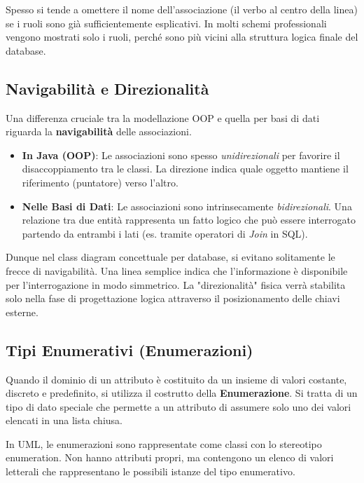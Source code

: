 \begin{observation}
    Spesso si tende a omettere il nome dell'associazione (il verbo al centro della linea) se i ruoli sono già sufficientemente esplicativi. In molti schemi professionali vengono mostrati solo i ruoli, perché sono più vicini alla struttura logica finale del database.
\end{observation}

\subsection{Navigabilità e Direzionalità}

Una differenza cruciale tra la modellazione OOP e quella per basi di dati riguarda la \textbf{navigabilità} delle associazioni.

\begin{itemize}
    \item \textbf{In Java (OOP)}: Le associazioni sono spesso \textit{unidirezionali} per favorire il disaccoppiamento tra le classi. La direzione indica quale oggetto mantiene il riferimento (puntatore) verso l'altro.
    \item \textbf{Nelle Basi di Dati}: Le associazioni sono intrinsecamente \textit{bidirezionali}. Una relazione tra due entità rappresenta un fatto logico che può essere interrogato partendo da entrambi i lati (es. tramite operatori di \textit{Join} in SQL).
\end{itemize}

\medskip

Dunque nel class diagram concettuale per database, si evitano solitamente le frecce di navigabilità. Una linea semplice indica che l'informazione è disponibile per l'interrogazione in modo simmetrico. La "direzionalità" fisica verrà stabilita solo nella fase di progettazione logica attraverso il posizionamento delle chiavi esterne.


\subsection{Tipi Enumerativi (Enumerazioni)}

Quando il dominio di un attributo è costituito da un insieme di valori costante, discreto e predefinito, si utilizza il costrutto della \textbf{Enumerazione}. Si tratta di un tipo di dato speciale che permette a un attributo di assumere solo uno dei valori elencati in una lista chiusa.

In UML, le enumerazioni sono rappresentate come classi con lo stereotipo \guillemotleft enumeration\guillemotright. Non hanno attributi propri, ma contengono un elenco di valori letterali che rappresentano le possibili istanze del tipo enumerativo.


